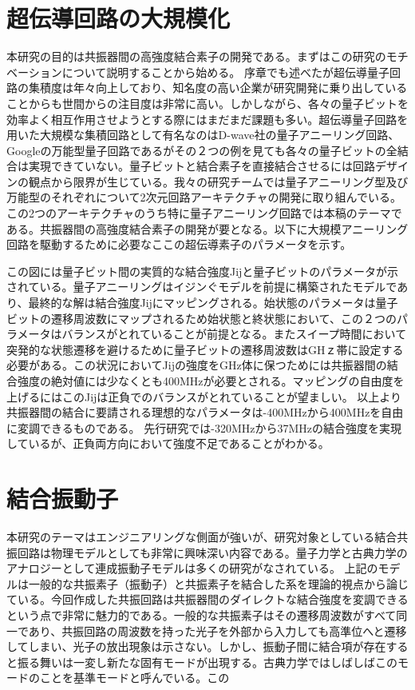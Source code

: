 \section{超伝導回路の大規模化}
    本研究の目的は共振器間の高強度結合素子の開発である。まずはこの研究のモチベーションについて説明することから始める。
    序章でも述べたが超伝導量子回路の集積度は年々向上しており、知名度の高い企業が研究開発に乗り出していることからも世間からの注目度は非常に高い。しかしながら、各々の量子ビットを効率よく相互作用させようとする際にはまだまだ課題も多い。超伝導量子回路を用いた大規模な集積回路として有名なのはD-wave社の量子アニーリング回路、Googleの万能型量子回路であるがその２つの例を見ても各々の量子ビットの全結合は実現できていない。量子ビットと結合素子を直接結合させるには回路デザインの観点から限界が生じている。我々の研究チームでは量子アニーリング型及び万能型のそれぞれについて2次元回路アーキテクチャの開発に取り組んでいる。この2つのアーキテクチャのうち特に量子アニーリング回路では本稿のテーマである。共振器間の高強度結合素子の開発が要となる。以下に大規模アニーリング回路を駆動するために必要なここの超伝導素子のパラメータを示す。

    この図には量子ビット間の実質的な結合強度Jijと量子ビットのパラメータが示されている。量子アニーリングはイジンぐモデルを前提に構築されたモデルであり、最終的な解は結合強度Jijにマッピングされる。始状態のパラメータは量子ビットの遷移周波数にマップされるため始状態と終状態において、この２つのパラメータはバランスがとれていることが前提となる。またスイープ時間において突発的な状態遷移を避けるために量子ビットの遷移周波数はGHｚ帯に設定する必要がある。この状況においてJijの強度をGHz体に保つためには共振器間の結合強度の絶対値には少なくとも400MHzが必要とされる。マッピングの自由度を上げるにはこのJijは正負でのバランスがとれていることが望ましい。
    以上より共振器間の結合に要請される理想的なパラメータは-400MHzから400MHzを自由に変調できるものである。
    先行研究\cite*{Wulschner2016}では-320MHzから37MHzの結合強度を実現しているが、正負両方向において強度不足であることがわかる。

\section{}

\section{結合振動子}
    本研究のテーマはエンジニアリングな側面が強いが、研究対象としている結合共振回路は物理モデルとしても非常に興味深い内容である。量子力学と古典力学のアナロジーとして連成振動子モデルは多くの研究がなされている。\cite*{Rodriguez2016}\cite*{Ivakhnenko2018}\cite*{Novotny2010}
    上記のモデルは一般的な共振素子（振動子）と共振素子を結合した系を理論的視点から論じている。今回作成した共振回路は共振器間のダイレクトな結合強度を変調できるという点で非常に魅力的である。一般的な共振素子はその遷移周波数がすべて同一であり、共振回路の周波数を持った光子を外部から入力しても高準位へと遷移してしまい、光子の放出現象は示さない。しかし、振動子間に結合項が存在すると振る舞いは一変し新たな固有モードが出現する。古典力学ではしばしばこのモードのことを基準モードと呼んでいる。この
